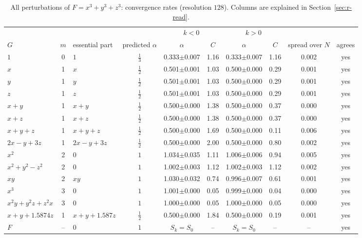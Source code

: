 \documentclass[12pt, a4paper, oneside]{book}
\theoremstyle{plain}
\theoremstyle{definition}
\theoremstyle{remark}
\theoremstyle{definition}
\begin{document}
\begin{table}[!h]
\centering
\footnotesize
\begin{adjustbox}{max width=\textwidth}
\begin{tabular}{l c l c c c c c c c}
\toprule
& & & & \multicolumn{2}{c}{$k<0$} & \multicolumn{2}{c}{$k>0$} & & \\
\cmidrule(lr){5-6}\cmidrule(lr){7-8}
$G$ & $m$ & essential part & predicted $\alpha$ & $\alpha$ & $C$ & $\alpha$ & $C$ & spread over $N$ & agrees \\
\midrule
$1$ & 0 & $1$ & $\tfrac13$ & 0.333{\scriptsize$\pm$0.007} & 1.16 & 0.333{\scriptsize$\pm$0.007} & 1.16 & 0.002 & yes \\
$x$ & 1 & $x$ & $\tfrac12$ & 0.501{\scriptsize$\pm$0.001} & 1.03 & 0.500{\scriptsize$\pm$0.000} & 0.29 & 0.001 & yes \\
$y$ & 1 & $y$ & $\tfrac12$ & 0.501{\scriptsize$\pm$0.001} & 1.03 & 0.500{\scriptsize$\pm$0.000} & 0.29 & 0.001 & yes \\
$z$ & 1 & $z$ & $\tfrac12$ & 0.501{\scriptsize$\pm$0.001} & 1.03 & 0.500{\scriptsize$\pm$0.000} & 0.29 & 0.001 & yes \\
$x+y$ & 1 & $x + y$ & $\tfrac12$ & 0.500{\scriptsize$\pm$0.000} & 1.38 & 0.500{\scriptsize$\pm$0.000} & 0.37 & 0.000 & yes \\
$x+z$ & 1 & $x + z$ & $\tfrac12$ & 0.500{\scriptsize$\pm$0.000} & 1.38 & 0.500{\scriptsize$\pm$0.000} & 0.37 & 0.000 & yes \\
$x+y+z$ & 1 & $x + y + z$ & $\tfrac12$ & 0.500{\scriptsize$\pm$0.000} & 1.69 & 0.500{\scriptsize$\pm$0.000} & 0.11 & 0.006 & yes \\
$2x-y+3z$ & 1 & $2x - y + 3z$ & $\tfrac12$ & 0.500{\scriptsize$\pm$0.000} & 2.00 & 0.500{\scriptsize$\pm$0.000} & 0.80 & 0.002 & yes \\
$x^2$ & 2 & $0$ & $1$ & 1.034{\scriptsize$\pm$0.035} & 1.11 & 1.006{\scriptsize$\pm$0.006} & 0.94 & 0.005 & yes \\
$x^2+y^2-z^2$ & 2 & $0$ & $1$ & 1.002{\scriptsize$\pm$0.003} & 1.12 & 1.002{\scriptsize$\pm$0.003} & 1.12 & 0.002 & yes \\
$xy$ & 2 & $xy$ & $1$ & 1.030{\scriptsize$\pm$0.032} & 0.74 & 0.996{\scriptsize$\pm$0.007} & 0.61 & 0.001 & yes \\
$x^3$ & 3 & $0$ & $1$ & 1.001{\scriptsize$\pm$0.000} & 0.05 & 0.999{\scriptsize$\pm$0.000} & 0.04 & 0.000 & yes \\
$x^2y+y^2z+z^2x$ & 3 & $0$ & $1$ & 1.000{\scriptsize$\pm$0.000} & 0.05 & 1.000{\scriptsize$\pm$0.000} & 0.05 & 0.000 & yes \\
$x+y+1.5874z$ & 1 & $x + y + 1.587z$ & $\tfrac12$ & 0.500{\scriptsize$\pm$0.000} & 1.84 & 0.500{\scriptsize$\pm$0.000} & 0.19 & 0.001 & yes \\
$F$ & -- & $0$ & $1$ & $S_k=S_0$ & -- & $S_k=S_0$ & -- & -- & yes \\
\bottomrule
\end{tabular}
\end{adjustbox}
\caption[Rates for $x^3+y^3+z^3$]{All perturbations of $F=x^3+y^3+z^3$: convergence rates (resolution $128$). Columns are explained in Section~\ref{sec:r-read}.}
\label{tab:r-E6a-rates}
\end{table}
\end{document}
